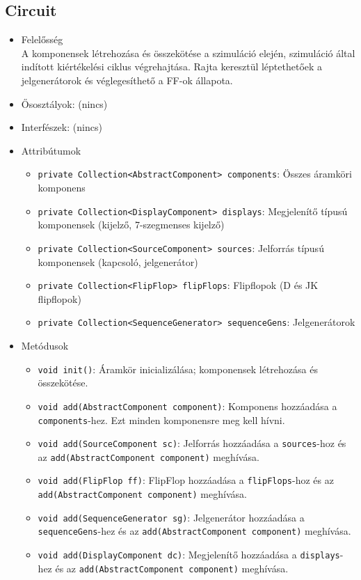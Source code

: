 \subsection{Circuit}
\begin{itemize}
\item Felelősség\\
A komponensek létrehozása és összekötése a szimuláció elején, szimuláció által indított kiértékelési ciklus végrehajtása. Rajta keresztül léptethetőek a jelgenerátorok és véglegesíthető a FF-ok állapota.
\item Ősosztályok: (nincs)
\item Interfészek: (nincs)
\item Attribútumok $\ $
\begin{itemize}
	\item \texttt{private Collection<AbstractComponent> components}: Összes áramköri komponens
	\item \texttt{private Collection<DisplayComponent> displays}: Megjelenítő típusú komponensek (kijelző, 7-szegmenses kijelző)
	\item \texttt{private Collection<SourceComponent> sources}: Jelforrás típusú komponensek (kapcsoló, jelgenerátor)
	\item \texttt{private Collection<FlipFlop> flipFlops}: Flipflopok (D és JK flipflopok)
	\item \texttt{private Collection<SequenceGenerator> sequenceGens}: Jelgenerátorok
\end{itemize}
\item Metódusok$\ $
\begin{itemize}
	\item \texttt{void init()}: Áramkör inicializálása; komponensek létrehozása és összekötése.
	\item \texttt{void add(AbstractComponent component)}: Komponens hozzáadása a \texttt{components}-hez. Ezt minden komponensre meg kell hívni.
	\item \raggedright \texttt{void add(SourceComponent sc)}: Jelforrás hozzáadása a \texttt{sources}-hoz és az \texttt{add(AbstractComponent component)} meghívása.
	\item \raggedright \texttt{void add(FlipFlop ff)}: FlipFlop hozzáadása a \texttt{flipFlops}-hoz és az \texttt{add(AbstractComponent component)} meghívása.
	\item \raggedright \texttt{void add(SequenceGenerator sg)}: Jelgenerátor hozzáadása a \texttt{sequenceGens}-hez és az \texttt{add(AbstractComponent component)} meghívása.
	\item \raggedright \texttt{void add(DisplayComponent dc)}: Megjelenítő hozzáadása a \texttt{displays}-hez és az \texttt{add(AbstractComponent component)} meghívása.

\end{itemize}
\end{itemize}
